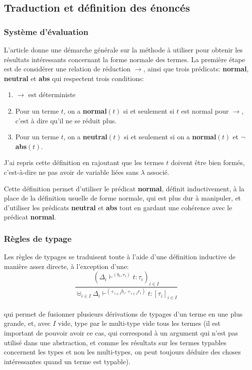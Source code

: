 \documentclass[10pt]{article}
\begin{document}
\subsection{Traduction et définition des énoncés}
\subsubsection{Système d'évaluation}
L'article donne une démarche générale sur la méthode à utiliser pour obtenir les résultats intéressants concernant la forme normale des termes. La première étape est de considérer une relation de réduction $\rightarrow$, ainsi que trois prédicats: \textbf{normal}, \textbf{neutral} et \textbf{abs} qui respectent trois conditions:
\begin{enumerate}
  \item $\rightarrow$ est déterministe
  \item Pour un terme $t$, on a \textbf{normal}$(t)$ si et seulement si $t$ est normal pour $\rightarrow$, c'est à dire qu'il ne se réduit plus.
  \item Pour un terme $t$, on a \textbf{neutral}$(t)$ si et seulement si on a \textbf{normal}$(t)$ et $\lnot$\textbf{abs}$(t)$.
\end{enumerate}
J'ai repris cette définition en rajoutant que les termes $t$ doivent être bien formés, c'est-à-dire ne pas avoir de variable liées sans $\lambda$ associé.

Cette définition permet d'utiliser le prédicat \textbf{normal}, définit inductivement, à la place de la définition usuelle de forme normale, qui est plus dur à manipuler, et d'utiliser les prédicats \textbf{neutral} et \textbf{abs} tout en gardant une cohérence avec le prédicat \textbf{normal}.

\subsubsection{Règles de typage}
Les règles de typages se traduisent toute à l'aide d'une définition inductive de manière assez directe, à l'exception d'une:
\begin{displaymath}
  \frac{
    (\Delta_i \vdash^{(b_i, r_i)} t : \tau_i)_{i\in I}
  }{
    \uplus_{i \in I} \Delta_i \vdash^{(+_{i \in I} b_i, +_{i \in I} r_i)} t : [\tau_i]_{i\in I}
  }
\end{displaymath}\\
qui permet de fusionner plusieurs dérivations de typages d'un terme en une plus grande, et, avec $I$ vide, type par le multi-type vide tous les termes (il est important de pouvoir avoir ce cas, qui correspond à un argument qui n'est pas utilisé dans une abstraction, et comme les résultats sur les termes typables concernent les types et non les multi-types, on peut toujours déduire des choses intéressantes quand un terme est typable).
\end{document}
